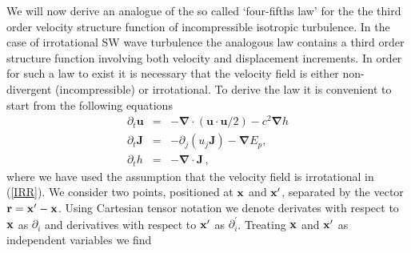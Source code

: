 \documentclass{jfm}
\providecommand\bnabla{\boldsymbol{\nabla}}
\newcommand\p{\ensuremath{\partial}}
\newcommand{\uu}{\textbf{u}}
\newcommand{\JJ}{\textbf{J}}
\begin{document}
We will now derive an analogue of the so called `four-fifths  law' \cite[]{Kolmogorov1941} for the the third order velocity structure function of incompressible isotropic turbulence.   In the case of irrotational SW wave turbulence the analogous law contains a third order structure function involving both velocity and displacement increments.  In order for such a law to exist it is necessary that the velocity field is either non-divergent (incompressible) or irrotational. To derive the law it is convenient to start from the following equations
\begin{eqnarray} \label{IRR}
\p_t \uu &=& -\bnabla \cdot (\uu \cdot \uu /2) - c^2 \bnabla h  \\
\p_t \JJ &=& -\p_j (u_j \JJ) - \bnabla E_p,\\
\p_t h   &=& -\bnabla \cdot \JJ \, ,
\end{eqnarray}
where we have used the  assumption that the velocity field is irrotational in (\ref{IRR}). We consider two points, positioned at $ \bf x $ and $ {\bf x}^\prime $, separated by the vector $ {\bf r} = {\bf x}^\prime - {\bf x} $.
Using Cartesian tensor notation we denote derivates with respect to $ {\bf x} $ as $ \partial_i $ and derivatives with respect to $ {\bf x}^\prime $ as $ \partial^{\prime}_i $. Treating $ \bf x $ and $ {\bf x}^\prime $ as independent variables we find
\end{document}
